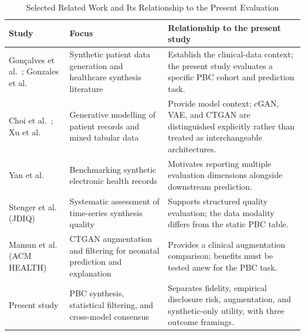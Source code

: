 
\begin{table}[!t]
\revisioncolor
\centering
\caption{\revisioncolor Selected Related Work and Its Relationship to the Present Evaluation}
\label{tab:related}
\footnotesize
\begin{tabular}{p{}p{}p{}}
\toprule
Study & Focus & Relationship to the present study \\
\midrule
Gon\c{c}alves et al.\ \cite{goncalves2020}; Gonzales et al.\ \cite{gonzales2023} & Synthetic patient data generation and healthcare synthesis literature & Establish the clinical-data context; the present study evaluates a specific PBC cohort and prediction task. \\
Choi et al.\ \cite{choi2017}; Xu et al.\ \cite{xu2019} & Generative modelling of patient records and mixed tabular data & Provide model context; cGAN, VAE, and CTGAN are distinguished explicitly rather than treated as interchangeable architectures. \\
Yan et al.\ \cite{yan2022} & Benchmarking synthetic electronic health records & Motivates reporting multiple evaluation dimensions alongside downstream prediction. \\
Stenger et al.\ \cite{stenger2024} (JDIQ) & Systematic assessment of time-series synthesis quality & Supports structured quality evaluation; the data modality differs from the static PBC table. \\
Mamun et al.\ \cite{mamun2026} (ACM HEALTH) & CTGAN augmentation and filtering for neonatal prediction and explanation & Provides a clinical augmentation comparison; benefits must be tested anew for the PBC task. \\
Present study & PBC synthesis, statistical filtering, and cross-model consensus & Separates fidelity, empirical disclosure risk, augmentation, and synthetic-only utility, with three outcome framings. \\
\bottomrule
\end{tabular}
\end{table}

